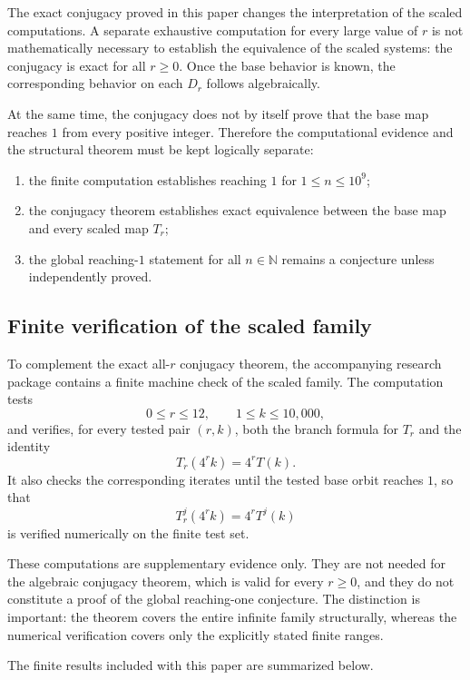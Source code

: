 \documentclass[11pt]{article}
\newcommand{\N}{\mathbb{N}}
\begin{document}
The exact conjugacy proved in this paper changes the interpretation of the scaled computations. A separate exhaustive computation for every large value of $r$ is not mathematically necessary to establish the equivalence of the scaled systems: the conjugacy is exact for all $r\ge0$. Once the base behavior is known, the corresponding behavior on each $D_r$ follows algebraically.

At the same time, the conjugacy does not by itself prove that the base map reaches $1$ from every positive integer. Therefore the computational evidence and the structural theorem must be kept logically separate:
\begin{enumerate}[label=(\roman*)]
\item the finite computation establishes reaching $1$ for $1\le n\le10^9$;
\item the conjugacy theorem establishes exact equivalence between the base map and every scaled map $T_r$;
\item the global reaching-$1$ statement for all $n\in\N$ remains a conjecture unless independently proved.
\end{enumerate}


\subsection{Finite verification of the scaled family}
To complement the exact all-\(r\) conjugacy theorem, the accompanying research package
contains a finite machine check of the scaled family. The computation tests
\[
0\le r\le12,\qquad 1\le k\le10{,}000,
\]
and verifies, for every tested pair \((r,k)\), both the branch formula for \(T_r\) and the
identity
\[
T_r(4^rk)=4^rT(k).
\]
It also checks the corresponding iterates until the tested base orbit reaches \(1\), so that
\[
T_r^j(4^rk)=4^rT^j(k)
\]
is verified numerically on the finite test set.

These computations are supplementary evidence only. They are not needed for the algebraic
conjugacy theorem, which is valid for every \(r\ge0\), and they do not constitute a proof
of the global reaching-one conjecture. The distinction is important: the theorem covers
the entire infinite family structurally, whereas the numerical verification covers only
the explicitly stated finite ranges.

The finite results included with this paper are summarized below.
\end{document}
